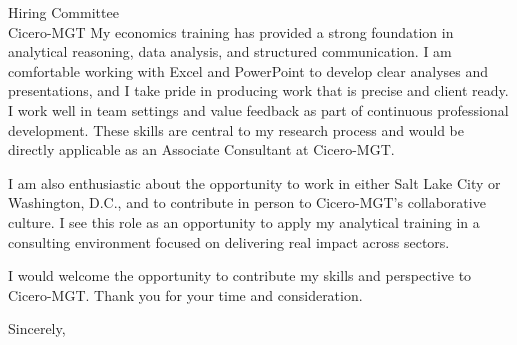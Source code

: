 \documentclass[11pt]{letter}
\begin{document}
\begin{letter}{Hiring Committee \\ Cicero\textregistered-MGT}
My economics training has provided a strong foundation in analytical reasoning, data analysis, and structured communication. I am comfortable working with Excel and PowerPoint to develop clear analyses and presentations, and I take pride in producing work that is precise and client ready. I work well in team settings and value feedback as part of continuous professional development. These skills are central to my research process and would be directly applicable as an Associate Consultant at Cicero-MGT.

I am also enthusiastic about the opportunity to work in either Salt Lake City or Washington, D.C., and to contribute in person to Cicero-MGT’s collaborative culture. I see this role as an opportunity to apply my analytical training in a consulting environment focused on delivering real impact across sectors.

I would welcome the opportunity to contribute my skills and perspective to Cicero-MGT. Thank you for your time and consideration.

\closing{Sincerely,}

\end{letter}
\end{document}
